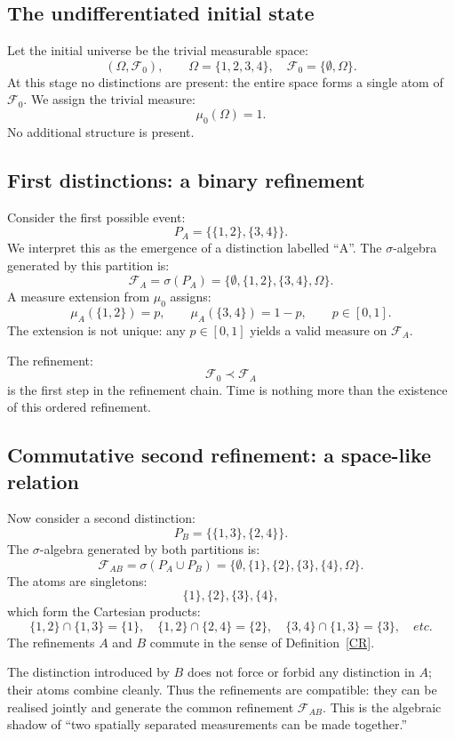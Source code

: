 \documentclass[
 amsmath,amssymb,
  onecolumn %
]{revtex4-2}
\begin{document}
\subsection{The undifferentiated initial state}
Let the initial universe be the trivial measurable space:
$$
(\Omega,\mathcal F_0), \qquad
\Omega=\{1,2,3,4\},\quad
\mathcal F_0=\{\emptyset,\Omega\}.
$$
At this stage no distinctions are present: the entire space forms a single
atom of $\mathcal F_0$.
We assign the trivial measure:
$$
\mu_0(\Omega)=1.
$$
No additional structure is present.

\subsection{First distinctions: a binary refinement} 
Consider the first possible event:
$$
P_A = \big\{\{1,2\},\{3,4\}\big\}.
$$
We interpret this as the emergence of a distinction labelled “A”. The $\sigma$-algebra generated by this partition is:
$$
\mathcal F_A = \sigma(P_A)
= \{\emptyset,\{1,2\},\{3,4\},\Omega\}.
$$
A measure extension from $\mu_0$ assigns:
$$
\mu_A(\{1,2\}) = p,\qquad
\mu_A(\{3,4\}) = 1-p, \qquad p\in[0,1].
$$
The extension is not unique: any $p\in[0,1]$ yields a valid measure on
$\mathcal F_A$.

The refinement:
$$
\mathcal F_0 \prec \mathcal F_A
$$
is the first step in the refinement chain. Time is nothing more than the existence of this ordered refinement.

\subsection{Commutative second refinement: a space-like relation} 
Now consider a second distinction:
$$
P_B=\big\{ \{1,3\},\{2,4\}\big\}.
$$
The $\sigma$-algebra generated by both partitions is:
$$
\mathcal F_{AB} = \sigma(P_A \cup P_B)
= \{\emptyset, \{1\},\{2\},\{3\},\{4\}, \Omega\}.
$$
The atoms are singletons:
$$
\{1\},\{2\},\{3\},\{4\},
$$
which form the Cartesian products:
$$
\{1,2\}\cap\{1,3\}=\{1\},\quad
\{1,2\}\cap\{2,4\}=\{2\},\quad
\{3,4\}\cap\{1,3\}=\{3\},\quad
etc.
$$
The refinements $A$ and $B$ commute in the sense of
Definition~\ref{CR}.

The distinction introduced by $B$ does not force or forbid any distinction in $A$; their atoms combine cleanly.
Thus the refinements are compatible: they can be realised jointly and
generate the common refinement $\mathcal F_{AB}$. This is the algebraic shadow of “two spatially separated measurements can be made together.”
\end{document}
